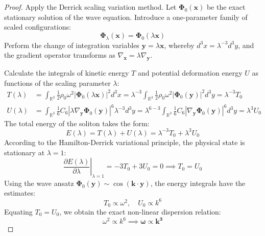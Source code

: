 \documentclass[12pt,a4paper]{article}
\begin{document}
	\begin{proof}
		Apply the Derrick scaling variation method. Let $\boldsymbol{\Phi}_0(\mathbf{x})$ be the exact stationary solution of the wave equation. Introduce a one-parameter family of scaled configurations:
		\begin{equation}
			\boldsymbol{\Phi}_\lambda(\mathbf{x}) = \boldsymbol{\Phi}_0(\lambda \mathbf{x})
		\end{equation}
		Perform the change of integration variables $\mathbf{y} = \lambda \mathbf{x}$, whereby $d^3x = \lambda^{-3} d^3y$, and the gradient operator transforms as $\nabla_\mathbf{x} = \lambda \nabla_\mathbf{y}$. 
		
		Calculate the integrals of kinetic energy $T$ and potential deformation energy $U$ as functions of the scaling parameter $\lambda$:
		\begin{align}
			T(\lambda) &= \int_{\mathbb{R}^3} \frac{1}{2} \rho_0 \omega^2 |\boldsymbol{\Phi}_0(\lambda \mathbf{x})|^2 d^3x = \lambda^{-3} \int_{\mathbb{R}^3} \frac{1}{2} \rho_0 \omega^2 |\boldsymbol{\Phi}_0(\mathbf{y})|^2 d^3y = \lambda^{-3} T_0 \\
			U(\lambda) &= \int_{\mathbb{R}^3} \frac{1}{6} C_6 |\lambda \nabla_\mathbf{y} \boldsymbol{\Phi}_0(\mathbf{y})|^6 \lambda^{-3} d^3y = \lambda^{6 - 3} \int_{\mathbb{R}^3} \frac{1}{6} C_6 |\nabla_\mathbf{y} \boldsymbol{\Phi}_0(\mathbf{y})|^6 d^3y = \lambda^3 U_0
		\end{align}
		The total energy of the soliton takes the form:
		\begin{equation}
			E(\lambda) = T(\lambda) + U(\lambda) = \lambda^{-3} T_0 + \lambda^3 U_0
		\end{equation}
		According to the Hamilton-Derrick variational principle, the physical state is stationary at $\lambda = 1$:
		\begin{equation}
			\left. \frac{\partial E(\lambda)}{\partial \lambda} \right|_{\lambda=1} = -3 T_0 + 3 U_0 = 0 \implies T_0 = U_0
		\end{equation}
		Using the wave ansatz $\boldsymbol{\Phi}_0(\mathbf{y}) \sim \cos(\mathbf{k} \cdot \mathbf{y})$, the energy integrals have the estimates:
		\begin{equation}
			T_0 \propto \omega^2, \quad U_0 \propto k^6
		\end{equation}
		Equating $T_0 = U_0$, we obtain the exact non-linear dispersion relation:
		\begin{equation}
			\omega^2 \propto k^6 \implies \mathbf{\omega \propto k^3}
		\end{equation}
	\end{proof}
	
\end{document}
